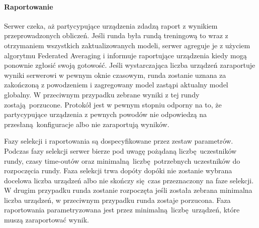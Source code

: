 \paragraph{Raportowanie}
Serwer czeka, aż partycypujące urządzenia zdadzą raport z wynikiem przeprowadzonych obliczeń. Jeśli runda była rundą treningową to wraz z otrzymaniem wszystkich zaktualizowanych modeli, serwer agreguje je z użyciem algorytmu Federated Averaging i informuje raportujące urządzenia kiedy mogą ponownie zgłosić swoją gotowość. Jeśli wystarczająca liczba urządzeń zaraportuje wyniki serwerowi w pewnym oknie czasowym, runda zostanie uznana za zakończoną z powodzeniem i zagregowany model zastąpi aktualny model globalny. W przeciwnym przypadku zebrane wyniki z tej rundy zostają porzucone. Protokół jest w pewnym stopniu odporny na to, że partycypujące urządzenia z pewnych powodów nie odpowiedzą na przesłaną konfiguracje albo nie zaraportują wyników.

\vspace{5mm}

Fazy selekcji i raportowania są dospecyfikowane przez zestaw parametrów. Podczas fazy selekcji  serwer bierze pod uwagę pożądaną liczbę uczestników rundy, czasy time-outów oraz minimalną liczbę potrzebnych uczestników do rozpoczęcia rundy. Faza selekcji trwa dopóty dopóki nie zostanie wybrana docelowa liczba urządzeń albo nie skończy się czas przeznaczony na faze selekcji. W drugim przypadku runda zostanie rozpoczęta jeśli została zebrana minimalna liczba urządzeń, w przeciwnym przypadku runda zostaje porzucona. Faza raportowania parametryzowana jest przez minimalną liczbę urządzeń, które muszą zaraportować wynik.


